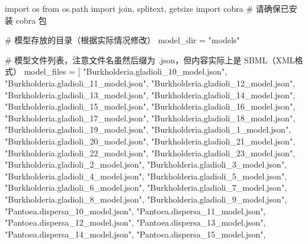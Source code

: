 \documentclass[
  letterpaper,
  DIV=11,
  numbers=noendperiod]{scrartcl}
\newenvironment{Shaded}{\begin{snugshade}}{\end{snugshade}}
\newcommand{\CommentTok}[1]{\textcolor[rgb]{0.37,0.37,0.37}{#1}}
\newcommand{\ImportTok}[1]{\textcolor[rgb]{0.00,0.46,0.62}{#1}}
\newcommand{\NormalTok}[1]{\textcolor[rgb]{0.00,0.23,0.31}{#1}}
\newcommand{\OperatorTok}[1]{\textcolor[rgb]{0.37,0.37,0.37}{#1}}
\newcommand{\StringTok}[1]{\textcolor[rgb]{0.13,0.47,0.30}{#1}}
\begin{document}
\begin{Shaded}
\begin{Highlighting}[]
\ImportTok{import}\NormalTok{ os}
\ImportTok{from}\NormalTok{ os.path }\ImportTok{import}\NormalTok{ join, splitext, getsize}
\ImportTok{import}\NormalTok{ cobra  }\CommentTok{\# 请确保已安装 cobra 包}

\CommentTok{\# 模型存放的目录（根据实际情况修改）}
\NormalTok{model\_dir }\OperatorTok{=} \StringTok{"models"}

\CommentTok{\# 模型文件列表，注意文件名虽然后缀为 .json，但内容实际上是 SBML（XML格式）}
\NormalTok{model\_files }\OperatorTok{=}\NormalTok{ [}
    \StringTok{"Burkholderia.gladioli\_10\_model.json"}\NormalTok{,}
    \StringTok{"Burkholderia.gladioli\_11\_model.json"}\NormalTok{,}
    \StringTok{"Burkholderia.gladioli\_12\_model.json"}\NormalTok{,}
    \StringTok{"Burkholderia.gladioli\_13\_model.json"}\NormalTok{,}
    \StringTok{"Burkholderia.gladioli\_14\_model.json"}\NormalTok{,}
    \StringTok{"Burkholderia.gladioli\_15\_model.json"}\NormalTok{,}
    \StringTok{"Burkholderia.gladioli\_16\_model.json"}\NormalTok{,}
    \StringTok{"Burkholderia.gladioli\_17\_model.json"}\NormalTok{,}
    \StringTok{"Burkholderia.gladioli\_18\_model.json"}\NormalTok{,}
    \StringTok{"Burkholderia.gladioli\_19\_model.json"}\NormalTok{,}
    \StringTok{"Burkholderia.gladioli\_1\_model.json"}\NormalTok{,}
    \StringTok{"Burkholderia.gladioli\_20\_model.json"}\NormalTok{,}
    \StringTok{"Burkholderia.gladioli\_21\_model.json"}\NormalTok{,}
    \StringTok{"Burkholderia.gladioli\_22\_model.json"}\NormalTok{,}
    \StringTok{"Burkholderia.gladioli\_23\_model.json"}\NormalTok{,}
    \StringTok{"Burkholderia.gladioli\_2\_model.json"}\NormalTok{,}
    \StringTok{"Burkholderia.gladioli\_3\_model.json"}\NormalTok{,}
    \StringTok{"Burkholderia.gladioli\_4\_model.json"}\NormalTok{,}
    \StringTok{"Burkholderia.gladioli\_5\_model.json"}\NormalTok{,}
    \StringTok{"Burkholderia.gladioli\_6\_model.json"}\NormalTok{,}
    \StringTok{"Burkholderia.gladioli\_7\_model.json"}\NormalTok{,}
    \StringTok{"Burkholderia.gladioli\_8\_model.json"}\NormalTok{,}
    \StringTok{"Burkholderia.gladioli\_9\_model.json"}\NormalTok{,}
    \StringTok{"Pantoea.dispersa\_10\_model.json"}\NormalTok{,}
    \StringTok{"Pantoea.dispersa\_11\_model.json"}\NormalTok{,}
    \StringTok{"Pantoea.dispersa\_12\_model.json"}\NormalTok{,}
    \StringTok{"Pantoea.dispersa\_13\_model.json"}\NormalTok{,}
    \StringTok{"Pantoea.dispersa\_14\_model.json"}\NormalTok{,}
    \StringTok{"Pantoea.dispersa\_15\_model.json"}\NormalTok{,}

\end{Highlighting}
\end{Shaded}
\end{document}
